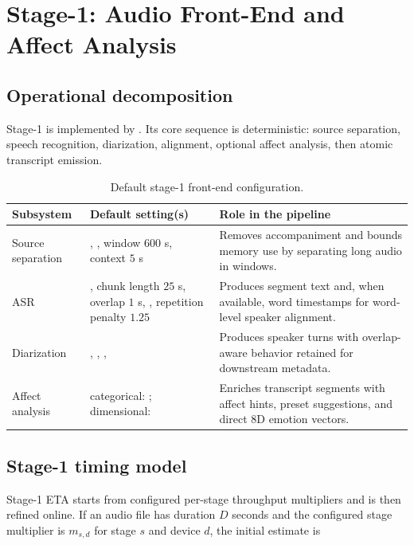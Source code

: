 \chapter{Stage-1: Audio Front-End and Affect Analysis}

\section{Operational decomposition}

Stage-1 is implemented by . Its core sequence is deterministic: source separation, speech recognition, diarization, alignment, optional affect analysis, then atomic transcript emission.

\begin{table}[H]
\centering
\small
\begin{tabularx}{\textwidth}{L{3.2cm}L{3.3cm}Y}
\toprule
Subsystem & Default setting(s) & Role in the pipeline \\
\midrule
Source separation & , , window \(600\) s, context \(5\) s & Removes accompaniment and bounds memory use by separating long audio in windows. \\
ASR & , chunk length \(25\) s, overlap \(1\) s, , repetition penalty \(1.25\) & Produces segment text and, when available, word timestamps for word-level speaker alignment. \\
Diarization & , , ,  & Produces speaker turns with overlap-aware behavior retained for downstream metadata. \\
Affect analysis & categorical: ; dimensional:  & Enriches transcript segments with affect hints, preset suggestions, and direct 8D emotion vectors. \\
\bottomrule
\end{tabularx}
\caption{Default stage-1 front-end configuration.}
\label{tab:stage1-defaults}
\end{table}

\section{Stage-1 timing model}

Stage-1 ETA starts from configured per-stage throughput multipliers and is then refined online. If an audio file has duration \(D\) seconds and the configured stage multiplier is \(m_{s,d}\) for stage \(s\) and device \(d\), the initial estimate is

